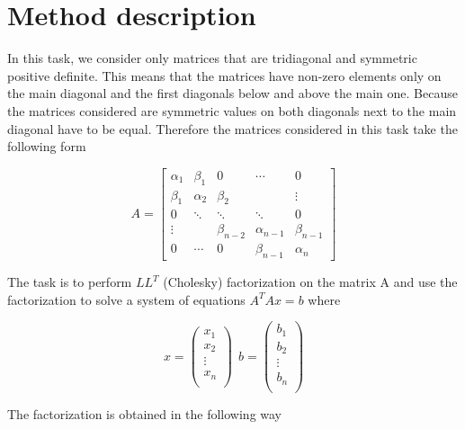 \documentclass[12pt]{article}
\begin{document}
\maketitle

\section{Method description}

In this task, we consider only matrices that are tridiagonal and symmetric positive definite. This means that the matrices have non-zero elements only on the main diagonal and the first diagonals below and above the main one. Because the matrices considered are symmetric values on both diagonals next to the main diagonal have to be equal. Therefore the matrices considered in this task take the following form

$$
A= \left[
\begin{array}{ccccc}
\alpha_1 & \beta_1 & 0 &\cdots&0\\
\beta_1 & \alpha_2 & \beta_2 & &\vdots\\
0 &\ddots&\ddots&\ddots& 0\\
\vdots&  & \beta_{n-2} & \alpha_{n-1} & \beta_{n-1}\\
0 & \cdots& 0 & \beta_{n-1} & \alpha_n
\end{array}
\right]
$$

The task is to perform $LL^T$ (Cholesky) factorization on the matrix A and use the factorization to solve a system of equations $A^TAx=b$ where 

$$
x=\left(
\begin{array}{c}
x_1\\
x_2\\
\vdots\\
x_n\\
\end{array}
\right)
\ \
b=\left(
\begin{array}{c}
b_1\\
b_2\\
\vdots\\
b_n\\
\end{array}
\right)
$$

The factorization is obtained in the following way\\
\end{document}
